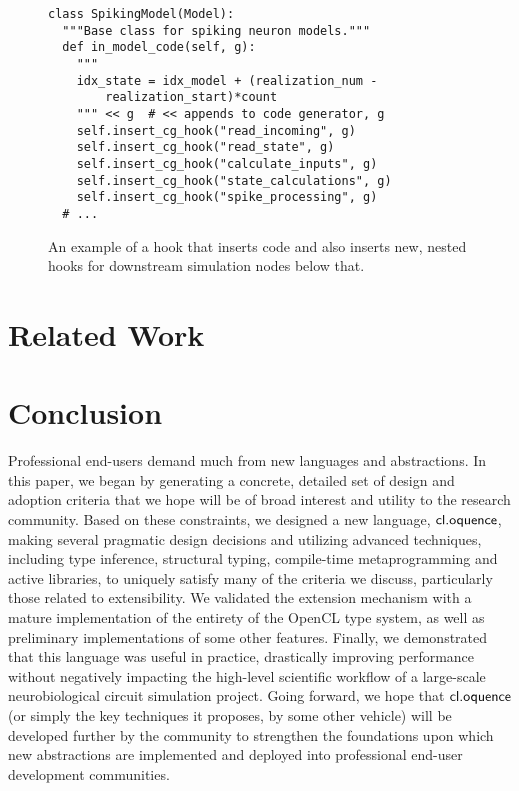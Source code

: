 \documentclass[10pt, conference, compsocconf]{IEEEtran}
\begin{document}
\begin{figure}\small{
\begin{verbatim}
class SpikingModel(Model):
  """Base class for spiking neuron models."""
  def in_model_code(self, g):
    """
    idx_state = idx_model + (realization_num - 
        realization_start)*count
    """ << g  # << appends to code generator, g
    self.insert_cg_hook("read_incoming", g)
    self.insert_cg_hook("read_state", g)
    self.insert_cg_hook("calculate_inputs", g)
    self.insert_cg_hook("state_calculations", g)
    self.insert_cg_hook("spike_processing", g)
  # ...
\end{verbatim}}
\caption{An example of a hook that inserts code and also inserts new, nested hooks for downstream simulation nodes  below that.}
\label{impl}
\end{figure}

\section{Related Work}

\section{Conclusion}
Professional end-users demand much from new languages and abstractions. In this paper, we began by generating a concrete, detailed set of design and adoption criteria that we hope will be of broad interest and utility to the research community. Based on these constraints, we designed a new language, $\textsf{cl.oquence}$, making several pragmatic design decisions and utilizing advanced techniques, including type inference, structural typing, compile-time metaprogramming and active libraries, to uniquely satisfy many of the criteria we discuss, particularly those related to extensibility. We validated the extension mechanism with a mature implementation of  the entirety of the OpenCL type system, as well as preliminary implementations of some other features. Finally, we demonstrated that this language was useful in practice, drastically improving performance without negatively impacting the high-level scientific workflow of a large-scale neurobiological circuit simulation project. Going forward, we hope that $\textsf{cl.oquence}$ (or simply the key techniques it proposes, by some other vehicle) will be developed further by the community to strengthen the foundations upon which new abstractions are implemented and deployed into professional end-user development communities.
\end{document}
